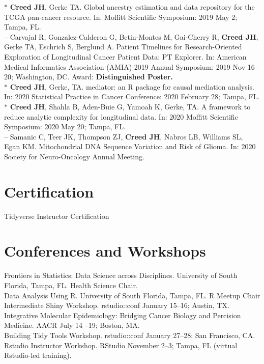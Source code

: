 \documentclass[11pt, a4paper]{article} %
\newcommand{\years}[1]{\marginnote{\scriptsize \raise .3ex\hbox{#1}}} %
\begin{document}
$*$ {\bf Creed JH}, Gerke TA. Global ancestry estimation and data repository for the TCGA pan-cancer resource.  In: Moffitt Scientific Symposium: 2019 May 2; Tampa, FL. \\

-- Carvajal R, Gonzalez-Calderon G, Betin-Montes M, Gai-Cherry R, {\bf Creed JH}, Gerke TA, Eschrich S, Berglund A. Patient Timelines for Research-Oriented Exploration of Longitudinal Cancer Patient Data: PT Explorer. In: American Medical Informatics Association (AMIA) 2019 Annual Symposium: 2019 Nov 16--20; Washington, DC. Award: {\bf Distinguished Poster.}\\

$*$ {\bf Creed JH}, Gerke, TA. mediator: an R package for causal mediation analysis.  In: 2020 Statistical Practice in Cancer Conference: 2020 February 28; Tampa, FL. \\ 

$*$ {\bf Creed JH}, Shahla B, Aden-Buie G, Yamoah K, Gerke, TA. A framework to reduce analytic complexity for longitudinal data.  In: 2020 Moffitt Scientific Symposium: 2020 May 20; Tampa, FL. \\ 

-- Samanic C, Teer JK, Thompson ZJ, {\bf Creed JH}, Nabros LB, Williams SL, Egan KM. Mitochondrial DNA Sequence Variation and Risk of Glioma. In: 2020 Society for Neuro-Oncology Annual Meeting. 

\section*{Certification}

\years{2020} Tidyverse Instructor Certification 

\section*{Conferences and Workshops}

\years{2018} Frontiers in Statistics: Data Science across Disciplines. University of South Florida, Tampa, FL. Health Science Chair. \\
\years{2018} Data Analysis Using R. University of South Florida, Tampa, FL. R Meetup Chair \\ 
\years{2019} Intermediate Shiny Workshop. rstudio::conf January 15--16;  Austin, TX.  \\
\years{2019} Integrative Molecular Epidemiology: Bridging Cancer Biology and Percision Medicine. AACR July 14 --19; Boston, MA. \\
\years{2020} Building Tidy Tools Workshop. rstudio::conf January 27--28; San Francisco, CA.  \\
\years{2020} Rstudio Instructor Workshop. RStudio November 2--3; Tampa, FL (virtual Rstudio-led training). \\
\end{document}
